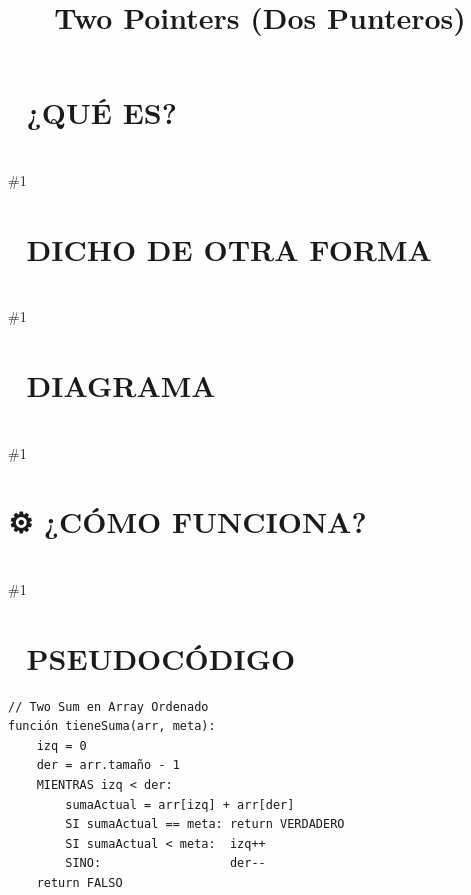 \documentclass{article}
\newcommand{\quees}[1]{\section*{🤔 ¿QUÉ ES?}\hrulefill \\ \#1}
\newcommand{\dichodeotraforma}[1]{\section*{💬 DICHO DE OTRA FORMA}\hrulefill \\ \#1}
\newcommand{\diagrama}[1]{\section*{🎨 DIAGRAMA}\hrulefill \\ \#1}
\newcommand{\comofunciona}[1]{\section*{⚙️ ¿CÓMO FUNCIONA?}\hrulefill \\ \#1}
\begin{document}
\title{Two Pointers (Dos Punteros)}
\date{}
\maketitle
\quees{Dos personas en extremos opuestos de un pasillo 🚶‍♂️...🚶‍♀️ caminando 
hacia el centro para encontrarse. O un corredor lento y uno rápido 
en la misma pista 🏃‍♂️💨...🏃‍♂️.

En lugar de usar un solo índice para recorrer un array (un loop 
simple), usas DOS. Estos punteros se mueven de forma coordinada
para resolver problemas de búsqueda o comparación mucho más rápido
que la fuerza bruta.

Es uno de los patrones más útiles para entrevistas técnicas porque 
suele reducir soluciones de O(n^2) a O(n).}
\dichodeotraforma{El patrón Two Pointers utiliza dos variables de índice para recorrer
una estructura de datos lineal (array, string, linked list). 

Existen dos variantes principales:
1. Opposite Ends: Los punteros empiezan en los extremos y se mueven
   hacia el centro. (Ej: Two Sum en array ordenado, Palíndromos).
2. Fast \& Slow: Un puntero avanza más rápido que el otro. (Ej: Detectar
   ciclos en Linked List, encontrar el medio).}
\diagrama{\begin{verbatim}
Problema: Encontrar par que sume 10 en array ordenado.
[ 1, 3, 4, 6, 8, 9 ]
  L              R   -> 1 + 9 = 10. ¡ENCONTRADO! 🎉

Si la suma fuera menor a 10, moveríamos L a la derecha.
Si la suma fuera mayor a 10, moveríamos R a la izquierda.
\end{verbatim}}
\comofunciona{Opposite Ends:
1. Inicializas `left = 0` y `right = n - 1`.
2. Mientras `left < right`:
   - Evalúas la condición con `arr[left]` y `arr[right]`.
   - Si se cumple la meta, terminas.
   - Si no, decides qué puntero mover según la lógica del problema.

Fast \& Slow (Floyd's Algorithm):
1. Inicializas `slow = start` y `fast = start`.
2. En cada paso: `slow` avanza 1, `fast` avanza 2.
3. Si `fast` alcanza el final, no hay ciclo.
4. Si `slow == fast`, ¡hay un ciclo!}
\section*{📝 PSEUDOCÓDIGO}
\hrulefill
\begin{verbatim}
// Two Sum en Array Ordenado
función tieneSuma(arr, meta):
    izq = 0
    der = arr.tamaño - 1
    MIENTRAS izq < der:
        sumaActual = arr[izq] + arr[der]
        SI sumaActual == meta: return VERDADERO
        SI sumaActual < meta:  izq++
        SINO:                  der--
    return FALSO
\end{verbatim}
\end{document}
